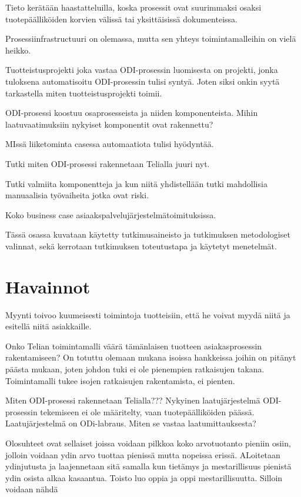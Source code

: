 \documentclass[finnish,12pt,a4paper,pdftex]{article}
\begin{document}
Tieto kerätään haastatteluilla, koska prosessit ovat suurimmaksi osaksi tuotepäälliköiden korvien välissä tai yksittäisissä dokumenteissa.

Prosessiinfrastructuuri on olemassa, mutta sen yhteys toimintamalleihin on vielä heikko. 

Tuotteistusprojekti joka vastaa ODI-prosessin luomisesta on projekti, jonka tuloksena automatisoitu ODI-prosessin tulisi syntyä. Joten siksi onkin syytä tarkastella miten tuotteistusprojekti toimii.


ODI-prosessi koostuu osaprosesseista ja niiden komponenteista. Mihin laatuvaatimuksiin nykyiset komponentit ovat rakennettu?



MIssä liiketominta casessa automaatiota tulisi hyödyntää. 

Tutki miten ODI-prosessi rakennetaan Telialla juuri nyt.

Tutki valmiita komponentteja ja kun niitä yhdistellään tutki mahdollisia manuaalisia työvaiheita jotka ovat riski.

Koko business case asiaakspalvelujärjestelmätoimituksissa.

Tässä osassa kuvataan käytetty tutkimusaineisto ja
tutkimuksen metodologiset valinnat, sekä
kerrotaan tutkimuksen toteutustapa ja käytetyt menetelmät. 

\clearpage

\section{Havainnot}

Myynti toivoo kuumeisesti toimintoja tuotteisiin, että he voivat myydä niitä ja esitellä niitä asiakkaille.

Onko Telian toimintamalli väärä tämänlaisen tuotteen asiakasprosessin rakentamiseen? On totuttu olemaan mukana isoissa hankkeissa joihin on pitänyt päästa mukaan, joten johdon tuki ei ole pienempien ratkaisujen takana. Toimintamalli tukee isojen ratkaisujen rakentamista, ei pienten.

Miten ODI-prosessi rakennetaan Telialla???
Nykyinen laatujärjestelmä ODI-prosessin tekemiseen ei ole määritelty, vaan tuotepäälliköiden päässä.
Laatujärjestelmä on ODi-labraus. Miten se vastaa laatumittauksesta?

Olosuhteet ovat sellaiset joissa voidaan pilkkoa koko arvotuotanto pieniin osiin, jolloin voidaan ydin arvo tuottaa pienissä mutta nopeissa erissä. ALoitetaan ydinjutusta ja laajennetaan sitä samalla kun tietämys ja mestarillisuus pienistä ydin osista alkaa kasaantua. Toisto luo oppia ja oppi mestarillisuutta. Silloin voidaan nähdä 
\end{document}
